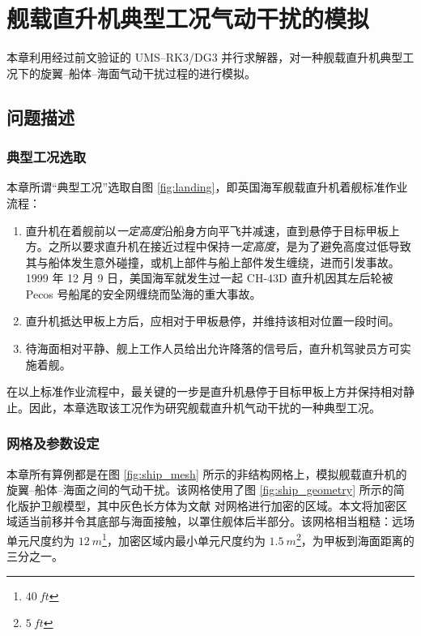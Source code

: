 \chapter{舰载直升机典型工况气动干扰的模拟\label{chap:=005E94=007528}}

本章利用经过前文验证的 UMS–RK3/DG3 并行求解器，对一种舰载直升机典型工况下的旋翼–船体–海面气动干扰过程的进行模拟。

\section{问题描述}

\subsection{典型工况选取}

本章所谓“典型工况”选取自图 \ref{fig:landing}，即英国海军舰载直升机着舰标准作业流程：
\begin{enumerate}[wide]
\item 直升机在着舰前以\emph{一定高度}沿船身方向平飞并减速，直到悬停于目标甲板上方。之所以要求直升机在接近过程中保持\emph{一定高度}，是为了避免高度过低导致其与船体发生意外碰撞，或机上部件与船上部件发生缠绕，进而引发事故。1999
年 12 月 9 日，美国海军就发生过一起 CH-43D 直升机因其左后轮被 Pecos 号船尾的安全网缠绕而坠海的重大事故。
\item 直升机抵达甲板上方后，应相对于甲板悬停，并维持该相对位置一段时间。
\item 待海面相对平静、舰上工作人员给出允许降落的信号后，直升机驾驶员方可实施着舰。
\end{enumerate}

在以上标准作业流程中，最关键的一步是直升机悬停于目标甲板上方并保持相对静止。因此，本章选取该工况作为研究舰载直升机气动干扰的一种典型工况。

\subsection{网格及参数设定}

本章所有算例都是在图 \ref{fig:ship_mesh} 所示的非结构网格上，模拟舰载直升机的旋翼–船体–海面之间的气动干扰。该网格使用了图
\ref{fig:ship_geometry} 所示的简化版护卫舰模型，其中灰色长方体为文献 \cite{Thedin_2020}
对网格进行加密的区域。本文将加密区域适当前移并令其底部与海面接触，以罩住舰体后半部分。该网格相当粗糙：远场单元尺度约为 $\SI{12}{m}$\footnote{$\SI{40}{ft}$}，加密区域内最小单元尺度约为
$\SI{1.5}{m}$\footnote{$\SI{5}{ft}$}，为甲板到海面距离的三分之一。

